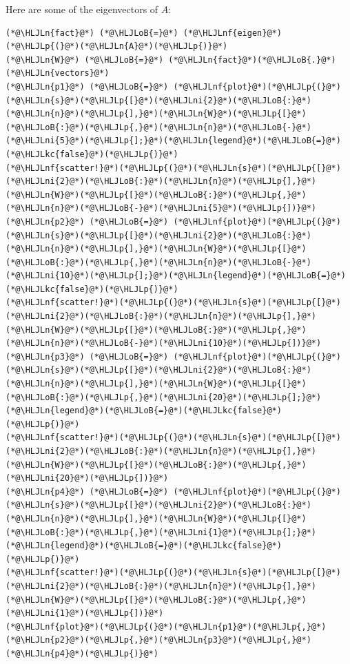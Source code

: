 \documentclass[12pt,a4paper]{article}
\newcommand{\HLJLkc}[1]{\textcolor[RGB]{59,151,46}{\textit{#1}}}
\newcommand{\HLJLn}[1]{#1}
\newcommand{\HLJLnf}[1]{\textcolor[RGB]{66,102,213}{#1}}
\newcommand{\HLJLni}[1]{\textcolor[RGB]{59,151,46}{#1}}
\newcommand{\HLJLoB}[1]{\textcolor[RGB]{102,102,102}{\textbf{#1}}}
\newcommand{\HLJLp}[1]{#1}
\begin{document}
Here are some of the eigenvectors of $A$:


\begin{lstlisting}
(*@\HLJLn{fact}@*) (*@\HLJLoB{=}@*) (*@\HLJLnf{eigen}@*)(*@\HLJLp{(}@*)(*@\HLJLn{A}@*)(*@\HLJLp{)}@*)
(*@\HLJLn{W}@*) (*@\HLJLoB{=}@*) (*@\HLJLn{fact}@*)(*@\HLJLoB{.}@*)(*@\HLJLn{vectors}@*)
(*@\HLJLn{p1}@*) (*@\HLJLoB{=}@*) (*@\HLJLnf{plot}@*)(*@\HLJLp{(}@*)(*@\HLJLn{s}@*)(*@\HLJLp{[}@*)(*@\HLJLni{2}@*)(*@\HLJLoB{:}@*)(*@\HLJLn{n}@*)(*@\HLJLp{],}@*)(*@\HLJLn{W}@*)(*@\HLJLp{[}@*)(*@\HLJLoB{:}@*)(*@\HLJLp{,}@*)(*@\HLJLn{n}@*)(*@\HLJLoB{-}@*)(*@\HLJLni{5}@*)(*@\HLJLp{];}@*)(*@\HLJLn{legend}@*)(*@\HLJLoB{=}@*)(*@\HLJLkc{false}@*)(*@\HLJLp{)}@*)
(*@\HLJLnf{scatter!}@*)(*@\HLJLp{(}@*)(*@\HLJLn{s}@*)(*@\HLJLp{[}@*)(*@\HLJLni{2}@*)(*@\HLJLoB{:}@*)(*@\HLJLn{n}@*)(*@\HLJLp{],}@*)(*@\HLJLn{W}@*)(*@\HLJLp{[}@*)(*@\HLJLoB{:}@*)(*@\HLJLp{,}@*)(*@\HLJLn{n}@*)(*@\HLJLoB{-}@*)(*@\HLJLni{5}@*)(*@\HLJLp{])}@*)
(*@\HLJLn{p2}@*) (*@\HLJLoB{=}@*) (*@\HLJLnf{plot}@*)(*@\HLJLp{(}@*)(*@\HLJLn{s}@*)(*@\HLJLp{[}@*)(*@\HLJLni{2}@*)(*@\HLJLoB{:}@*)(*@\HLJLn{n}@*)(*@\HLJLp{],}@*)(*@\HLJLn{W}@*)(*@\HLJLp{[}@*)(*@\HLJLoB{:}@*)(*@\HLJLp{,}@*)(*@\HLJLn{n}@*)(*@\HLJLoB{-}@*)(*@\HLJLni{10}@*)(*@\HLJLp{];}@*)(*@\HLJLn{legend}@*)(*@\HLJLoB{=}@*)(*@\HLJLkc{false}@*)(*@\HLJLp{)}@*)
(*@\HLJLnf{scatter!}@*)(*@\HLJLp{(}@*)(*@\HLJLn{s}@*)(*@\HLJLp{[}@*)(*@\HLJLni{2}@*)(*@\HLJLoB{:}@*)(*@\HLJLn{n}@*)(*@\HLJLp{],}@*)(*@\HLJLn{W}@*)(*@\HLJLp{[}@*)(*@\HLJLoB{:}@*)(*@\HLJLp{,}@*)(*@\HLJLn{n}@*)(*@\HLJLoB{-}@*)(*@\HLJLni{10}@*)(*@\HLJLp{])}@*)
(*@\HLJLn{p3}@*) (*@\HLJLoB{=}@*) (*@\HLJLnf{plot}@*)(*@\HLJLp{(}@*)(*@\HLJLn{s}@*)(*@\HLJLp{[}@*)(*@\HLJLni{2}@*)(*@\HLJLoB{:}@*)(*@\HLJLn{n}@*)(*@\HLJLp{],}@*)(*@\HLJLn{W}@*)(*@\HLJLp{[}@*)(*@\HLJLoB{:}@*)(*@\HLJLp{,}@*)(*@\HLJLni{20}@*)(*@\HLJLp{];}@*)(*@\HLJLn{legend}@*)(*@\HLJLoB{=}@*)(*@\HLJLkc{false}@*)(*@\HLJLp{)}@*)
(*@\HLJLnf{scatter!}@*)(*@\HLJLp{(}@*)(*@\HLJLn{s}@*)(*@\HLJLp{[}@*)(*@\HLJLni{2}@*)(*@\HLJLoB{:}@*)(*@\HLJLn{n}@*)(*@\HLJLp{],}@*)(*@\HLJLn{W}@*)(*@\HLJLp{[}@*)(*@\HLJLoB{:}@*)(*@\HLJLp{,}@*)(*@\HLJLni{20}@*)(*@\HLJLp{])}@*)
(*@\HLJLn{p4}@*) (*@\HLJLoB{=}@*) (*@\HLJLnf{plot}@*)(*@\HLJLp{(}@*)(*@\HLJLn{s}@*)(*@\HLJLp{[}@*)(*@\HLJLni{2}@*)(*@\HLJLoB{:}@*)(*@\HLJLn{n}@*)(*@\HLJLp{],}@*)(*@\HLJLn{W}@*)(*@\HLJLp{[}@*)(*@\HLJLoB{:}@*)(*@\HLJLp{,}@*)(*@\HLJLni{1}@*)(*@\HLJLp{];}@*)(*@\HLJLn{legend}@*)(*@\HLJLoB{=}@*)(*@\HLJLkc{false}@*)(*@\HLJLp{)}@*)
(*@\HLJLnf{scatter!}@*)(*@\HLJLp{(}@*)(*@\HLJLn{s}@*)(*@\HLJLp{[}@*)(*@\HLJLni{2}@*)(*@\HLJLoB{:}@*)(*@\HLJLn{n}@*)(*@\HLJLp{],}@*)(*@\HLJLn{W}@*)(*@\HLJLp{[}@*)(*@\HLJLoB{:}@*)(*@\HLJLp{,}@*)(*@\HLJLni{1}@*)(*@\HLJLp{])}@*)
(*@\HLJLnf{plot}@*)(*@\HLJLp{(}@*)(*@\HLJLn{p1}@*)(*@\HLJLp{,}@*)(*@\HLJLn{p2}@*)(*@\HLJLp{,}@*)(*@\HLJLn{p3}@*)(*@\HLJLp{,}@*)(*@\HLJLn{p4}@*)(*@\HLJLp{)}@*)
\end{lstlisting}
\end{document}
